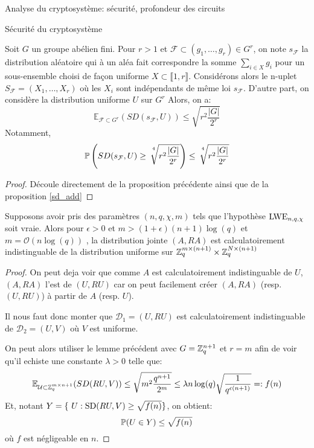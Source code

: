 \begin{section}{Analyse du cryptosystème: sécurité, profondeur des circuits}
\begin{subsection}{Sécurité du cryptosystème}
	\begin{cor}
	Soit $G$ un groupe abélien fini. Pour $r > 1$ et 
	$\mathcal{F} \subset (g_1, \ldots, g_r) \in G^r$, on
	note
	 $s_\mathcal{F}$ la distribution aléatoire qui à un aléa
	 fait correspondre la somme $\sum_{i\in X} g_i$ pour un
	 sous-ensemble choisi de façon uniforme  $X\subset \llbracket
	 1, r \rrbracket$. 
	 Considérons alors le n-uplet $S_\mathcal{F} = (X_1, \ldots, X_r)$ où 
	 les $X_i$ sont indépendants de même loi
	 $s_\mathcal{F}$.
	 D'autre part, on considère la distribution uniforme
	 $U$ sur $G^r$
	 Alors, on a: 
	 \[\mathbb{E}_{\mathcal{F}\subset G^r}(SD(s_\mathcal{F},U)) \leq 
	   \sqrt{r^2\frac{|G|}{2^r}}\]
	 Notamment, 
	 \[\mathbb{P}\left(SD(s_\mathcal{F},U) \geq
		 \sqrt[\leftroot{-3}\uproot{8}4\:]{r^2\frac{|G|}{2^r}} \right) \leq
		 \sqrt[\leftroot{-3}\uproot{8}4\:]{r^2\frac{|G|}{2^r}}
	 \]
	\end{cor}
	\begin{proof}
		Découle directement de la proposition précédente ainsi que de
		la proposition \ref{sd_add}
	\end{proof}

	\begin{prop}
	Supposons avoir pris des paramètres $(n, q, \chi, m)$
	tels que l'hypothèse $\text{LWE}_{n,q,\chi}$ soit vraie. Alors pour $\epsilon>0$
	et $m > (1+\epsilon)(n+1)\log(q)$ et $m = \mathcal{O}(n\log(q))$ , la distribution jointe
	$(A, RA)$ est calculatoirement indistinguable de la
	distribution uniforme sur $\mathbb{Z}_q^{m \times (n+1)} \times \mathbb{Z}_q^{N
	\times (n+1)}$
	\end{prop}
	\begin{proof}
	On peut deja voir que comme $A$ est calculatoirement
	indistinguable de $U$, $(A, RA)$ l'est de $(U,RU)$ car on 
	peut facilement créer $(A, RA)$ (resp. $(U, RU)$) à partir de
	$A$ (resp. $U$).

	Il nous faut donc monter que $\mathcal{D}_1 = (U, RU)$ est calculatoirement
	indistinguable de $\mathcal{D}_2 = (U, V)$ où $V$ est uniforme.
	
	On peut alors utiliser le lemme précédent avec $G = \mathbb{Z}_q^{n+1}$
	et $r = m$ afin de voir qu'il echiste une constante $\lambda > 0$
	telle que:
	\[\mathbb{E}_{\mathcal{U}\subset \mathbb{Z}_q^{m\times n+1}}(SD(RU,V)) \leq 
		\sqrt{m^2\frac{q^{n+1}}{2^m}}\leq \lambda
	n\log(q)\sqrt{\frac{1}{q^{\epsilon(n+1)}}}=: f(n) \]
	Et, notant $Y = \{ U: \SD(RU,V) \geq \sqrt{f(n)}\}$, on obtient:
	\[\mathbb{P}(U \in Y) \leq \sqrt{f(n)} \]
	où $f$ est négligeable en $n$. 




\end{proof}
\end{subsection}
\end{section}
